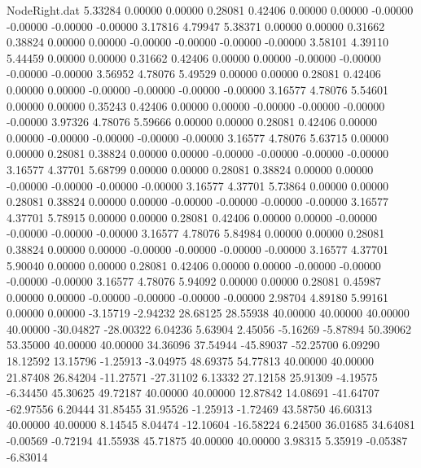 \begin{filecontents}{NodeRight.dat}
   5.33284    0.00000    0.00000     0.28081    0.42406    0.00000    0.00000   -0.00000   -0.00000   -0.00000   -0.00000    3.17816    4.79947
   5.38371    0.00000    0.00000     0.31662    0.38824    0.00000    0.00000   -0.00000   -0.00000   -0.00000   -0.00000    3.58101    4.39110
   5.44459    0.00000    0.00000     0.31662    0.42406    0.00000    0.00000   -0.00000   -0.00000   -0.00000   -0.00000    3.56952    4.78076
   5.49529    0.00000    0.00000     0.28081    0.42406    0.00000    0.00000   -0.00000   -0.00000   -0.00000   -0.00000    3.16577    4.78076
   5.54601    0.00000    0.00000     0.35243    0.42406    0.00000    0.00000   -0.00000   -0.00000   -0.00000   -0.00000    3.97326    4.78076
   5.59666    0.00000    0.00000     0.28081    0.42406    0.00000    0.00000   -0.00000   -0.00000   -0.00000   -0.00000    3.16577    4.78076
   5.63715    0.00000    0.00000     0.28081    0.38824    0.00000    0.00000   -0.00000   -0.00000   -0.00000   -0.00000    3.16577    4.37701
   5.68799    0.00000    0.00000     0.28081    0.38824    0.00000    0.00000   -0.00000   -0.00000   -0.00000   -0.00000    3.16577    4.37701
   5.73864    0.00000    0.00000     0.28081    0.38824    0.00000    0.00000   -0.00000   -0.00000   -0.00000   -0.00000    3.16577    4.37701
   5.78915    0.00000    0.00000     0.28081    0.42406    0.00000    0.00000   -0.00000   -0.00000   -0.00000   -0.00000    3.16577    4.78076
   5.84984    0.00000    0.00000     0.28081    0.38824    0.00000    0.00000   -0.00000   -0.00000   -0.00000   -0.00000    3.16577    4.37701
   5.90040    0.00000    0.00000     0.28081    0.42406    0.00000    0.00000   -0.00000   -0.00000   -0.00000   -0.00000    3.16577    4.78076
   5.94092    0.00000    0.00000     0.28081    0.45987    0.00000    0.00000   -0.00000   -0.00000   -0.00000   -0.00000    2.98704    4.89180
   5.99161    0.00000    0.00000    -3.15719   -2.94232   28.68125   28.55938   40.00000   40.00000   40.00000   40.00000  -30.04827  -28.00322
   6.04236    5.63904    2.45056    -5.16269   -5.87894   50.39062   53.35000   40.00000   40.00000   34.36096   37.54944  -45.89037  -52.25700
   6.09290   18.12592   13.15796    -1.25913   -3.04975   48.69375   54.77813   40.00000   40.00000   21.87408   26.84204  -11.27571  -27.31102
   6.13332   27.12158   25.91309    -4.19575   -6.34450   45.30625   49.72187   40.00000   40.00000   12.87842   14.08691  -41.64707  -62.97556
   6.20444   31.85455   31.95526    -1.25913   -1.72469   43.58750   46.60313   40.00000   40.00000    8.14545    8.04474  -12.10604  -16.58224
   6.24500   36.01685   34.64081    -0.00569   -0.72194   41.55938   45.71875   40.00000   40.00000    3.98315    5.35919   -0.05387   -6.83014

\end{filecontents}

